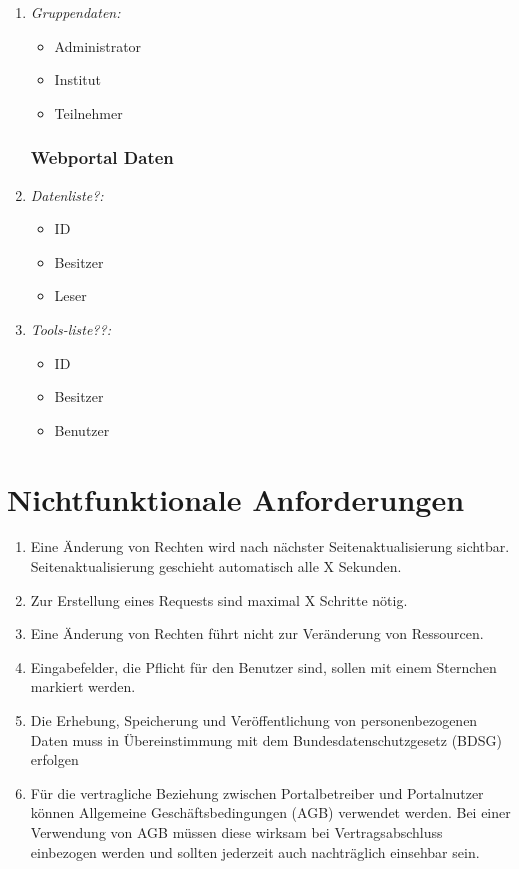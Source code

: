 \documentclass[parskip=full,11pt]{scrartcl}
\def\threedigits#1{%
  \ifnum#1<10 0\fi
  \ifnum#1<1 0\fi
  \number#1}
\begin{document}
\begin{enumerate}[label={\textbf{/D\protect\threedigits{\theenumi}0/}}, leftmargin=*]
\begin{itemize}
\end{itemize}

\item \textit{Gruppendaten:}
\begin{itemize}
\item Administrator
\item Institut
\item Teilnehmer
 \end{itemize}
 
\subsubsection{Webportal Daten}
\item \textit{Datenliste?:}
\begin{itemize}
\item ID
\item Besitzer
\item Leser
 \end{itemize}
 
 \item \textit{Tools-liste??:}
\begin{itemize}
\item ID
\item Besitzer
\item Benutzer
 \end{itemize}

\end{enumerate}
\section{Nichtfunktionale Anforderungen}
\begin{enumerate}[label={\textbf{/NF\protect\threedigits{\theenumi}0/}}, leftmargin=*]
\item Eine Änderung von Rechten wird nach nächster Seitenaktualisierung sichtbar. Seitenaktualisierung geschieht automatisch alle X Sekunden.
\item Zur Erstellung eines Requests sind maximal X Schritte nötig.
\item Eine Änderung von Rechten führt nicht zur Veränderung von Ressourcen.
\item Eingabefelder, die Pflicht für den Benutzer sind, sollen mit einem Sternchen markiert werden.
\item Die Erhebung, Speicherung und Veröffentlichung von personenbezogenen Daten muss in Übereinstimmung mit dem Bundesdatenschutzgesetz (BDSG) erfolgen
\item Für die vertragliche Beziehung zwischen Portalbetreiber und Portalnutzer können Allgemeine Geschäftsbedingungen (AGB) verwendet werden. Bei einer Verwendung von AGB müssen diese wirksam bei Vertragsabschluss einbezogen werden und sollten jederzeit auch nachträglich einsehbar sein.
\end{enumerate}
\end{document}
